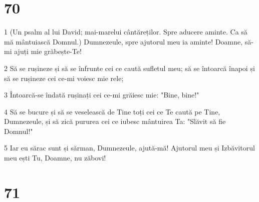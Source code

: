 \chapter{70}

\par 1 (Un psalm al lui David; mai-marelui cântăreților. Spre aducere aminte. Ca să mă mântuiască Domnul.) Dumnezeule, spre ajutorul meu ia aminte! Doamne, să-mi ajuți mie grăbește-Te!
\par 2 Să se rușineze și să se înfrunte cei ce caută sufletul meu; să se întoarcă înapoi și să se rușineze cei ce-mi voiesc mie rele;
\par 3 Întoarcă-se îndată rușinați cei ce-mi grăiesc mie: "Bine, bine!"
\par 4 Să se bucure și să se veselească de Tine toți cei ce Te caută pe Tine, Dumnezeule, și să zică pururea cei ce iubesc mântuirea Ta: "Slăvit să fie Domnul!"
\par 5 Iar eu sărac sunt și sărman, Dumnezeule, ajută-mă! Ajutorul meu și Izbăvitorul meu ești Tu, Doamne, nu zăbovi!

\chapter{71}

